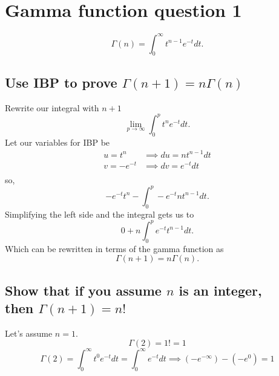 \section{Gamma function question 1}%
\label{sec:Gamma function question 1}
\[
\Gamma\left( n \right) =\int_{0}^{\infty} t^{n-1}e^{-t}dt
.\] 
\subsection{Use IBP to prove $\Gamma\left( n+1 \right) =n\Gamma\left( n \right) $}%
Rewrite our integral with $n+1$
\[
  \lim_{p \to \infty} \int_{0}^{p} t^{n}e^{-t}dt
.\] 
Let our variables for IBP be 
\begin{align*}
  u =t^{n} &\implies du=nt^{n-1}dt \\
  v= -e^{-t}&\implies dv =e^{-t}dt \\
\end{align*}
so,
\[
-e^{-t}t^{n}-\int_{0}^{p} -e^{-t}nt^{n-1}dt
.\] 
Simplifying the left side and the integral gets us to
\[
0+n\int_{0}^{p}e^{-t}t^{n-1}dt 
.\] 
Which can be rewritten in terms of the gamma function as 
\[
\Gamma\left( n+1 \right) =n\Gamma\left( n \right) 
.\] 
\subsection{Show that if you assume $n$ is an integer,\\ then $\Gamma\left( n+1 \right) =n!$}%
Let's assume $n=1$.
\[
\Gamma\left( 2 \right) =1! = 1
\] 
\[
\Gamma\left( 2 \right) =\int_{0}^{\infty} t^{0}e^{-t}dt = \int_{0}^{\infty} e^{-t}dt \implies \left( -e^{-\infty} \right) -\left( -e^{0} \right) =1
\]
